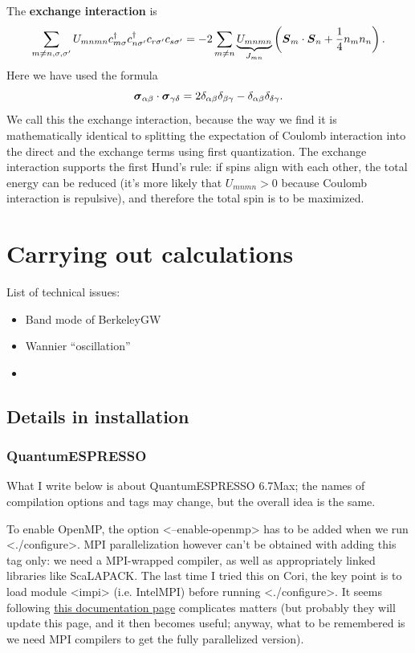 \documentclass[hyperref, a4paper, 12pt]{report}
\newcommand*{\concept}[1]{{\textbf{#1}}}
\def\texttt#1{<#1>}%
\newcommand{\shortcode}[1]{\texttt{#1}}
\begin{document}
The \concept{exchange interaction} is 
\begin{equation}
    \sum_{m \neq n, \sigma, \sigma'}
    U_{mnmn} c^\dagger_{m \sigma} c^\dagger_{n \sigma'} c_{r \sigma'} c_{s \sigma'}
    = - 2 \sum_{m \neq n} \underbrace{U_{mnmn}}_{J_{mn}} \left(
        \vb*{S}_m \cdot \vb*{S}_n + \frac{1}{4} n_m n_n
    \right).
\end{equation}
Here we have used the formula 
\begin{equation}
    \vb*{\sigma}_{\alpha \beta} \cdot \vb*{\sigma}_{\gamma \delta}
    = 2 \delta_{\alpha \beta} \delta_{\beta \gamma} - \delta_{\alpha \beta} \delta_{\delta \gamma}.
\end{equation}
We call this the exchange interaction, 
because the way we find it 
is mathematically identical to 
splitting the expectation of Coulomb interaction
into the direct and the exchange terms 
using first quantization.
The exchange interaction supports the first Hund's rule: 
if spins align with each other, 
the total energy can be reduced 
(it's more likely that $U_{mnmn} > 0$ because Coulomb interaction is repulsive),
and therefore the total spin is to be maximized.

\chapter{Carrying out calculations}

List of technical issues:
\begin{itemize}
    \item Band mode of BerkeleyGW
    \item Wannier ``oscillation''
    \item 
\end{itemize}

\section{Details in installation}

\subsection{QuantumESPRESSO}\label{sec:qe-install}

What I write below is about QuantumESPRESSO 6.7Max; 
the names of compilation options and tags may change, 
but the overall idea is the same. 

To enable OpenMP, 
the option \shortcode{--enable-openmp} has to be added 
when we run \shortcode{./configure}.
MPI parallelization however can't be obtained with adding this tag only: 
we need a MPI-wrapped compiler,
as well as appropriately linked libraries like ScaLAPACK. 
The last time I tried this on Cori, 
the key point is to load module \shortcode{impi} 
(i.e. IntelMPI) before running \shortcode{./configure}.
It seems following \href{https://docs.nersc.gov/applications/quantum-espresso/}{this documentation page}
complicates matters 
(but probably they will update this page, and it then becomes useful;
anyway, what to be remembered is we need MPI compilers 
to get the fully parallelized version).
\end{document}
